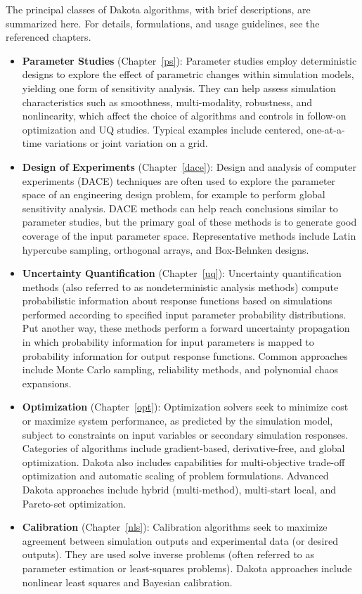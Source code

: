 The principal classes of Dakota algorithms, with brief descriptions,
are summarized here. For details, formulations, and usage guidelines,
see the referenced chapters.
\begin{itemize}
\item {\bf Parameter Studies} (Chapter~\ref{ps}): Parameter studies
  employ deterministic designs to explore the effect of parametric
  changes within simulation models, yielding one form of sensitivity
  analysis. They can help assess simulation characteristics such as
  smoothness, multi-modality, robustness, and nonlinearity, which
  affect the choice of algorithms and controls in follow-on
  optimization and UQ studies. Typical examples include centered,
  one-at-a-time variations or joint variation on a grid.

\item {\bf Design of Experiments} (Chapter~\ref{dace}): Design and
  analysis of computer experiments (DACE) techniques are often used to
  explore the parameter space of an engineering design problem, for
  example to perform global sensitivity analysis. DACE methods can
  help reach conclusions similar to parameter studies, but the primary
  goal of these methods is to generate good coverage of the input
  parameter space. Representative methods include Latin hypercube
  sampling, orthogonal arrays, and Box-Behnken designs.

\item {\bf Uncertainty Quantification} (Chapter~\ref{uq}): Uncertainty
  quantification methods (also referred to as nondeterministic
  analysis methods) compute probabilistic information about response
  functions based on simulations performed according to specified
  input parameter probability distributions. Put another way, these
  methods perform a forward uncertainty propagation in which
  probability information for input parameters is mapped to
  probability information for output response functions. Common
  approaches include Monte Carlo sampling, reliability methods, and
  polynomial chaos expansions.

\item {\bf Optimization} (Chapter~\ref{opt}): Optimization solvers
  seek to minimize cost or maximize system performance, as predicted
  by the simulation model, subject to constraints on input variables
  or secondary simulation responses. Categories of algorithms
  include gradient-based, derivative-free, and global optimization.
  Dakota also includes capabilities for multi-objective trade-off
  optimization and automatic scaling of problem formulations. Advanced
  Dakota approaches include hybrid (multi-method), multi-start local,
  and Pareto-set optimization.

\item {\bf Calibration} (Chapter~\ref{nls}): Calibration algorithms
  seek to maximize agreement between simulation outputs and
  experimental data (or desired outputs). They are used solve inverse
  problems (often referred to as parameter estimation or least-squares
  problems). Dakota approaches include nonlinear least squares and
  Bayesian calibration.

\end{itemize}

